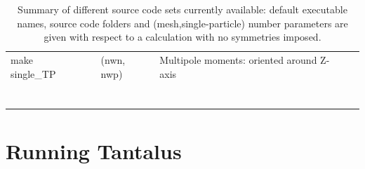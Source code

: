 \documentclass[print,amsmath,amssymb,aps,prc,nofootinbib,notitlepage]{revtex4-1}
\begin{document}
\begin{table}[t]
\begin{centering}
\begin{tabular}{l|l|l|l|c}
\textsf{make single\_TP}            &        & (nwn, nwp)                 &  Multipole moments: oriented around Z-axis    & \\
           &        &               & & \\
           &        &               & & \\
           &        &               & & \\
           &        &               & & \\
           &        &               & & \\
           &        &               & & \\
           &        &               & & \\
\hline
\hline
\end{tabular}
\end{centering}
\caption{Summary of different source code sets currently available: default
         executable names, source code folders and (mesh,single-particle) 
         number parameters are given with respect to a calculation with
         no symmetries imposed.}
\label{tab:options}
\end{table}

\clearpage

\section{Running Tantalus}
\end{document}

